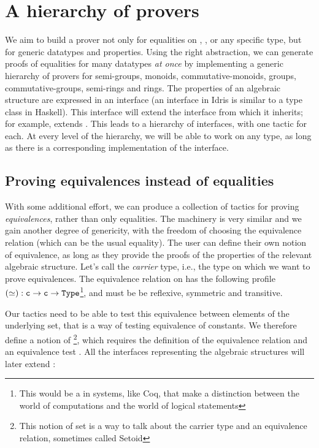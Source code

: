 \section{A hierarchy of provers}

We aim to build a prover not only for equalities on , , or
any specific type, but for generic datatypes and properties. Using
the right
abstraction, we can generate proofs of equalities for
many datatypes \emph{at once} by implementing a generic hierarchy of provers
for semi-groups, monoids,
commutative-monoids, groups, commutative-groups, semi-rings and rings. 
The
properties of an algebraic structure are expressed in an
interface (an interface in Idris is similar to a type class
in Haskell). This interface will extend the interface from which it
inherits; for example,  extends .
This leads to a hierarchy of interfaces, with one tactic
for each. At every level of the hierarchy, we will be able
to work on any type, as long as there is a corresponding implementation of
the interface.

\subsection{Proving equivalences instead of equalities}
	
With some additional effort, we can produce a collection of tactics for proving
\emph{equivalences}, rather than only equalities. 
The machinery is very similar and
we gain another
degree of genericity, with the freedom of choosing the equivalence relation
(which can be the usual equality). 
The user can define their own
notion of equivalence, as long as they provide the proofs of the
properties of the relevant algebraic structure. Let's call  the
\emph{carrier} type, i.e., the type on which we want to prove equivalences. 
The
equivalence relation on  has the following profile $(\simeq) : {\mbox{\texttt{c}}}
\rightarrow {\mbox{\texttt{c}}} \rightarrow {\mbox{\texttt{Type}}}$\footnote{This  would
be a  in systems, like Coq, that make a distinction between the
world of computations and the world of logical statements}, and must be
be reflexive, symmetric and transitive.

Our tactics need to be able to test this equivalence
between elements of the underlying set, that is a way of testing
equivalence of constants. We therefore define a notion of
\footnote{This notion of set 
is a way to talk about the carrier type and an equivalence
relation, sometimes called Setoid}, which requires the definition of the
equivalence relation and an equivalence test . All the interfaces
representing the algebraic structures will later extend :

